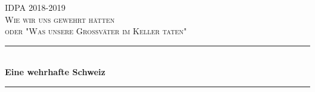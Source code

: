\begin{titlepage} %
	\newcommand{\HRule}{\rule{\linewidth}{0.5mm}} %
	
	\center %
	
	
	\textsc{\LARGE IDPA 2018-2019}\\[1.5cm] %
	
	\textsc{\Large Wie wir uns gewehrt hätten}\\[0.5cm] %
	
	\textsc{\large oder "Was unsere Grossväter im Keller taten"}\\[0.5cm] %
	
	
	\HRule\\[0.4cm]
	
	{\huge\bfseries Eine wehrhafte Schweiz}\\[0.4cm] %
	
	\HRule\\[1.5cm]
	
	
	

\end{titlepage}
